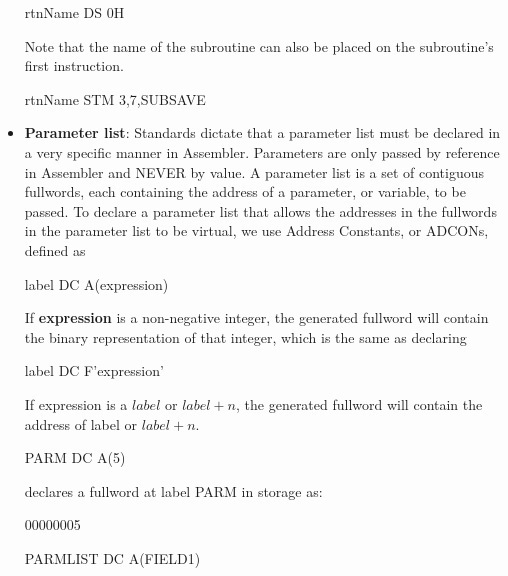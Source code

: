 \documentclass{report}
\begin{document}
\begin{itemize}
            \begin{cppcode}
            rtnName DS 0H
            \end{cppcode}
            Note that the name of the subroutine can also be placed on the subroutine's first instruction.
            \bigbreak \noindent 
            \begin{cppcode}
            rtnName STM 3,7,SUBSAVE
            \end{cppcode}
        \item \textbf{Parameter list}: Standards dictate that a parameter list must be declared in a very specific manner in Assembler.
            \bigbreak \noindent 
            Parameters are only passed by reference in Assembler and NEVER by value.
            \bigbreak \noindent 
            A parameter list is a set of contiguous fullwords, each containing the address of a parameter, or variable, to be passed.
            \bigbreak \noindent 
            To declare a parameter list that allows the addresses in the fullwords in the parameter list to be virtual, we use Address Constants, or ADCONs, defined as
            \bigbreak \noindent 
            \begin{cppcode}
            label DC A(expression)
            \end{cppcode}
            \bigbreak \noindent 
            If \textbf{expression} is a non-negative integer, the generated fullword will contain the binary representation of that integer, which is the same as declaring
            \bigbreak \noindent 
            \begin{cppcode}
            label DC F'expression'
            \end{cppcode}
            \bigbreak \noindent 
            If expression is a $label$ or $label+n$, the generated fullword will contain the address of label or $label+n$.
            \bigbreak \noindent 
            \begin{cppcode}
            PARM DC A(5)
            \end{cppcode}
            \bigbreak \noindent 
            declares a fullword at label PARM in storage as:
            \bigbreak \noindent 
            \begin{center}
                00000005
            \end{center}
            \bigbreak \noindent 
            \begin{cppcode}
            PARMLIST DC A(FIELD1)
            \end{cppcode}
            \bigbreak \noindent 

\end{itemize}
\end{document}
